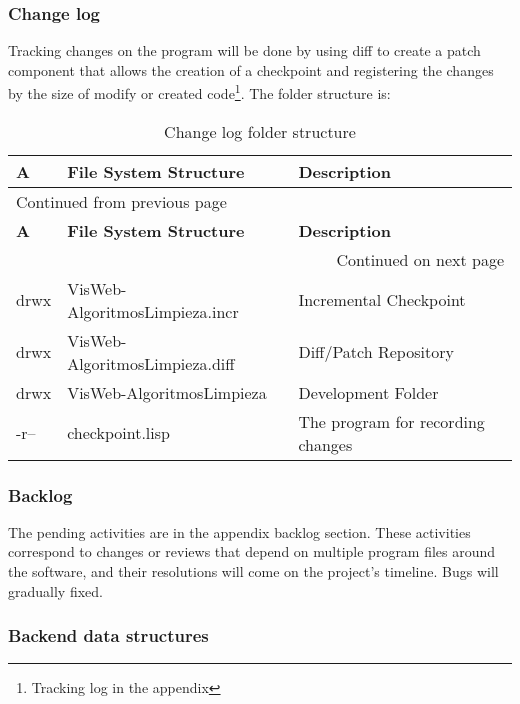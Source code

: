 \documentclass[a4paper]{article}
\begin{document}
\subsubsection{Change log}
\label{sec:org0cd0ff3}

Tracking changes on the program will be done by using diff to create a patch component that allows the creation of a checkpoint and registering the changes by the size of modify or created code\footnote{Tracking log in the appendix}. The folder structure is:

\begin{longtable}{lll}
\caption{Change log folder structure}
\\[0pt]
\textbf{A} & \textbf{File System Structure} & \textbf{Description}\\[0pt]
\hline
\endfirsthead
\multicolumn{3}{l}{Continued from previous page} \\[0pt]
\hline

\textbf{A} & \textbf{File System Structure} & \textbf{Description} \\[0pt]

\hline
\endhead
\hline\multicolumn{3}{r}{Continued on next page} \\
\endfoot
\endlastfoot
\hline
drwx & VisWeb-AlgoritmosLimpieza.incr & Incremental Checkpoint\\[0pt]
drwx & VisWeb-AlgoritmosLimpieza.diff & Diff/Patch Repository\\[0pt]
drwx & VisWeb-AlgoritmosLimpieza & Development Folder\\[0pt]
-r-- & checkpoint.lisp & The program for recording changes\\[0pt]
\end{longtable}

\subsubsection{Backlog}
\label{sec:orgf3c11a0}

The pending activities are in the appendix backlog section. These activities correspond to changes or reviews that depend on multiple program files around the software, and their resolutions will come on the project's timeline. Bugs will gradually fixed.

\subsubsection{Backend data structures}
\label{sec:org65d6d6c}
\end{document}
